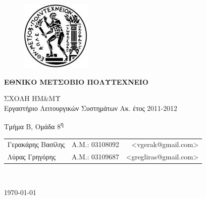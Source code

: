 \begin{titlepage}
    \begin{center}
        \begin{figure}[t] 
            \includegraphics[scale=0.7]{title/ntua_logo}
        \end{figure}
    \begin{LARGE}\textbf{ΕΘΝΙΚΟ ΜΕΤΣΟΒΙΟ ΠΟΛΥΤΕΧΝΕΙΟ\\}\end{LARGE}
        \vspace{2cm}
        \begin{Large}
            ΣΧΟΛΗ ΗΜ\&ΜΥ\\
            Εργαστήριο Λειτουργικών Συστημάτων
            Ακ. έτος 2011-2012\\
        \end{Large}
        \vspace{5cm}
        \Large Τμήμα Β, Ομάδα 8\textsuperscript{η}\\
        \vspace{1cm}
        \begin{tabular}{l r r}
            \Large{Γερακάρης Βασίλης}&
            \large{Α.Μ.: 03108092}&
            \small{<vgerak@gmail.com>}\\
            \Large{Λύρας Γρηγόρης}&
            \large{Α.Μ.: 03109687}&
            \small{<gregliras@gmail.com>}\\
        \end{tabular}\\
        \vspace{5cm}

        \vfill
        \large\today\\
    \end{center}
\end{titlepage}

